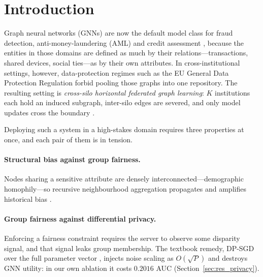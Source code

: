 \documentclass[preprint,12pt]{elsarticle}
\theoremstyle{plain}
\theoremstyle{definition}
\theoremstyle{remark}
\begin{document}
\section{Introduction}
\label{sec:intro}

Graph neural networks (GNNs) are now the default model class for fraud detection, anti-money-laundering (AML) and credit assessment \cite{kipf2016semi,velickovic2017graph,dou2020enhancing}, because the entities in those domains are defined as much by their relations---transactions, shared devices, social ties---as by their own attributes. In cross-institutional settings, however, data-protection regimes such as the EU General Data Protection Regulation forbid pooling those graphs into one repository. The resulting setting is \emph{cross-silo horizontal federated graph learning}: $K$ institutions each hold an induced subgraph, inter-silo edges are severed, and only model updates cross the boundary \cite{mcmahan2017communication,zhang2021federated}.

Deploying such a system in a high-stakes domain requires three properties at once, and each pair of them is in tension.

\paragraph{Structural bias against group fairness.} Nodes sharing a sensitive attribute are densely interconnected---demographic homophily---so recursive neighbourhood aggregation propagates and amplifies historical bias \cite{dai2021say,agarwal2021nifty}.

\paragraph{Group fairness against differential privacy.} Enforcing a fairness constraint requires the server to observe some disparity signal, and that signal leaks group membership. The textbook remedy, DP-SGD over the full parameter vector \cite{abadi2016deep}, injects noise scaling as $O(\sqrt{P})$ and destroys GNN utility: in our own ablation it costs $0.2016$ AUC (Section~\ref{sec:res_privacy}).
\end{document}
